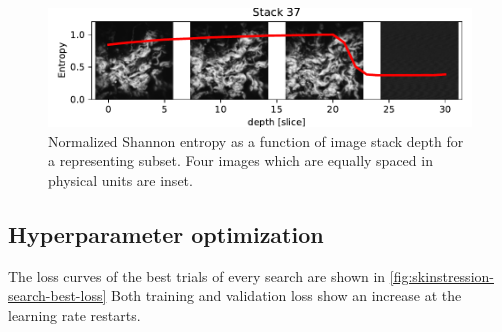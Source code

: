 \begin{figure}
    \includegraphics[width=\linewidth]{skinstression/images/entropy/37.pdf}
    \caption[Shannon entropy vs image stack depth]{
        Normalized Shannon entropy as a function of image stack depth for a representing subset.
        Four images which are equally spaced in physical units are inset.
    }
    \label{fig:skin_entropy_depth}
\end{figure}


\subsection{Hyperparameter optimization}

The loss curves of the best trials of every search are shown in \cref{fig:skinstression-search-best-loss}
Both training and validation loss show an increase at the learning rate restarts.

